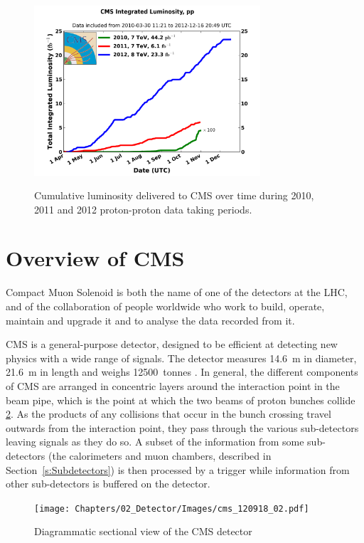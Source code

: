 \begin{figure}[hbtp]
   \centering
     \includegraphics[width=0.75\textwidth]{Chapters/02_Detector/Images/int_lumi_cumulative_pp_2.png}\\
     \caption{Cumulative luminosity delivered to CMS over time during 2010, 2011 and 2012 proton-proton data
     taking periods.}
     \label{fig:integrated_luminosity}
\end{figure}

\section{Overview of CMS}
\label{s:Overview}
Compact Muon Solenoid is both the name of one of the detectors at the LHC, and of the collaboration of
people worldwide who work to build, operate, maintain and upgrade it and to analyse the data recorded from it.

CMS is a general-purpose detector, designed to be efficient at detecting new physics with a wide range of
signals. The detector measures 14.6~m in diameter, 21.6~m in length and weighs 12500~tonnes
\cite{CMS_experiment}. In general, the different components of CMS are arranged in concentric layers around
the interaction point in the beam pipe, which is the point at which the two beams of proton bunches collide
\ref{fig:CMS_diagram}. As the products of any collisions that occur in the bunch crossing travel outwards from
the interaction point, they pass through the various sub-detectors leaving signals as they do so. A subset of
the information from some sub-detectors (the calorimeters and muon chambers, described in
Section~\ref{s:Subdetectors}) is then processed by a trigger while information from other sub-detectors is
buffered on the detector.

\begin{figure}[hbtp]
   \centering
     \texttt{[image: Chapters/02\_Detector/Images/cms\_120918\_02.pdf]}\hfill
     \caption{Diagrammatic sectional view of the CMS detector \cite{Sakuma_sketchup}}
     \label{fig:CMS_diagram}
 \end{figure}

